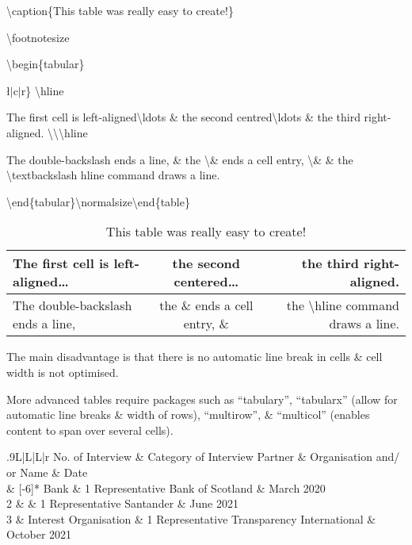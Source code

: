 \documentclass[a4paper,12pt,final]{article}
\begin{document}
\textbackslash caption\{This table was really easy to create!\}

\textbackslash footnotesize

\textbackslash begin\{tabular\}{\l$|$c$|$r\} \textbackslash hline 

The first cell is left-aligned\textbackslash ldots \& the second centred\textbackslash ldots \& the third right-aligned. \textbackslash\textbackslash \textbackslash hline 

The double-backslash ends a line, \& the \textbackslash \& ends a cell entry, \textbackslash \& \& the \textbackslash textbackslash hline command draws a line.

\textbackslash end\{tabular\}\textbackslash normalsize\textbackslash end\{table\}

\begin{table}[hb]
\caption{This table was really easy to create!}
\footnotesize
\begin{tabular}{l|c|r} \hline 
The first cell is left-aligned\ldots & the second centered\ldots & the third right-aligned. \\ \hline 
The double-backslash ends a line, & the \& ends a cell entry, \& & the \textbackslash hline command draws a line.
\end{tabular}\normalsize\end{table}

The main disadvantage is that there is no automatic line break in cells \& cell width is not optimised. 

\newpage 
More advanced tables require packages such as ``tabulary'', ``tabularx'' (allow for automatic line breaks \& width of rows), ``multirow'', \& ``multicol'' (enables content to span over several cells). 

\begin{spverbatim}
\begin{table}[htb!]
\caption{Overview of Conducted Interviews}
\label{tab:Interviews}
\footnotesize
\centering
\begin{tabulary}{.9\textwidth}{L|L|L|r}
\toprule 
{} No. of Interview & Category of Interview Partner & Organisation and/\,or Name & Date \\  & [-6]{*} Bank & 1 Representative Bank of Scotland & March 2020 \\ 
2 & & 1 Representative Santander & June 2021 \\ 
3 & Interest Organisation & 1 Representative Transparency International & October 2021 \\ \bottomrule
\end{tabulary}
\end{table}
\normalsize 
\end{spverbatim}

}
\end{document}
